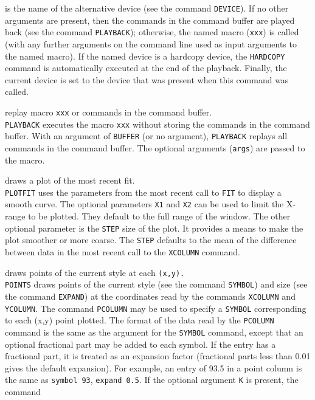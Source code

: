	is the name of the alternative device (see the command
	{\tt DEVICE}).  If no other
	arguments are present, then the commands in the command buffer
	are played back (see the command
	{\tt PLAYBACK});
	otherwise, the named macro ({\tt xxx}) is called (with
	any further arguments on the command line used as input arguments
	to the named macro).  If the named device is a hardcopy device, the
	{\tt HARDCOPY} command is automatically
	executed at the end of the playback.  Finally, the current device
	is set to the device that was present when this command was called.
\item [{\tt PLAYBACK [xxx args] } --] replay macro {\tt xxx} or commands in the command buffer.\\
	{\tt PLAYBACK} executes the macro {\tt xxx} without
	storing the commands in the command buffer.  With an argument of
	{\tt BUFFER} (or no argument),
	{\tt PLAYBACK} replays all commands in the command buffer.
	The optional arguments ({\tt args}) are passed to the macro.
\item [{\tt PLOTFIT [X1 X2 [STEP]] } --] draws a plot of the most recent fit.\\
	{\tt PLOTFIT} uses the parameters from the most recent
	call to {\tt FIT} to display a smooth
	curve.  The optional parameters {\tt X1} and {\tt X2}
	can be used to limit the X-range to be plotted.  They default to
	the full range of the window.  The other optional parameter is
	the {\tt STEP} size of the plot.  It provides a means to
	make the plot smoother or more coarse.  The {\tt STEP}
	defaults to the mean of the difference between data in the
	most recent call to the {\tt XCOLUMN}
	command.
\item [{\tt POINTS [K] } --] draws points of the current style at each {\tt (x,y).}\\
	{\tt POINTS} draws points of the current style (see the command
	{\tt SYMBOL}) and size (see the command
	{\tt EXPAND}) at the coordinates read by the
	commands {\tt XCOLUMN} and
	{\tt YCOLUMN}.
	The command {\tt PCOLUMN} may be used to
	specify a {\tt SYMBOL} corresponding to
	each (x,y) point plotted.  The format of the data read by the
	{\tt PCOLUMN} command is the same as the
	argument for the {\tt SYMBOL} command,
	except that an optional fractional part may be added to each symbol.
	If the entry has a fractional part, it is treated as an expansion
	factor (fractional parts less than 0.01 gives the default expansion).
	For example, an entry of 93.5 in a point column is the same as
	{\tt symbol 93},
	{\tt expand 0.5}.
	If the optional argument {\tt K} is present, the command
